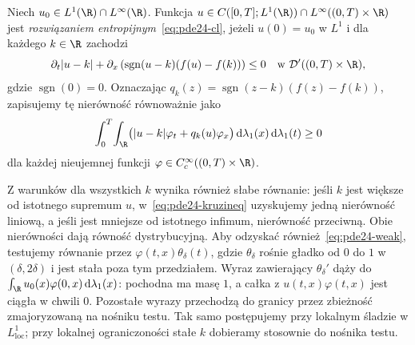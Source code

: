 \begin{definicja}
\label{def:pde24-kru}
Niech $u_0\in L^1(\R)\cap L^\infty(\R)$.
Funkcja $u\in C([0,T];L^1(\R))\cap L^\infty((0,T)\times\R)$
jest \emph{rozwiązaniem entropijnym}~\eqref{eq:pde24-cl}, jeżeli
$u(0)=u_0$ w $L^1$ i dla każdego $k\in\R$ zachodzi
\begin{equation}\label{eq:pde24-kruzineq}
 \partial_t|u-k|+\partial_x\left(
   \operatorname{sgn}(u-k)(f(u)-f(k))\right)\le0
 \quad\text{w }\mathcal D'((0,T)\times\R),
\end{equation}
gdzie $\operatorname{sgn}(0)=0$.
Oznaczając $q_k(z)=\operatorname{sgn}(z-k)(f(z)-f(k))$,
zapisujemy tę nierówność równoważnie jako
\[
 \int_0^T\!\int_\R
 \bigl(|u-k|\varphi_t+q_k(u)\varphi_x\bigr)
 \,\mathrm d\lambda_1(x)\,\mathrm d\lambda_1(t)\ge0
\]
dla każdej nieujemnej funkcji
$\varphi\in C_c^\infty((0,T)\times\R)$.
\end{definicja}

\begin{uwaga}
Z warunków dla wszystkich $k$
wynika również słabe równanie: jeśli $k$ jest większe od
istotnego supremum $u$, w~\eqref{eq:pde24-kruzineq}
uzyskujemy jedną nierówność liniową, a jeśli jest mniejsze
od istotnego infimum, nierówność przeciwną. Obie nierówności dają równość dystrybucyjną.
Aby odzyskać również~\eqref{eq:pde24-weak},
testujemy równanie przez $\varphi(t,x)\theta_\delta(t)$,
gdzie $\theta_\delta$ rośnie gładko od $0$ do $1$
w $(\delta,2\delta)$ i jest stała poza tym przedziałem.
Wyraz zawierający $\theta_\delta'$ dąży do
$\int_\R u_0(x)\varphi(0,x)\,\mathrm d\lambda_1(x)$:
pochodna ma masę $1$, a całka z $u(t,x)\varphi(t,x)$
jest ciągła w chwili $0$. Pozostałe wyrazy przechodzą
do granicy przez zbieżność zmajoryzowaną na nośniku
testu. Tak samo postępujemy przy lokalnym śladzie
w $L^1_{\mathrm{loc}}$; przy lokalnej ograniczoności
stałe $k$ dobieramy stosownie do nośnika testu.
\end{uwaga}

